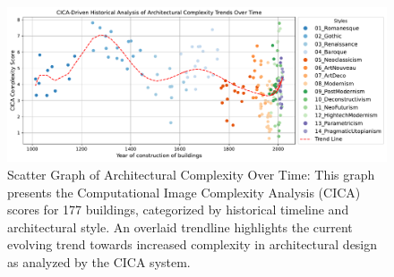 \documentclass[final,5p,times]{elsarticle}
\begin{document}
\begin{figure}[htb]
      \centering
      \includegraphics[width= \linewidth]{Graphs/complexitygraph}
      \caption{Scatter Graph of Architectural Complexity Over Time: This graph presents the Computational Image Complexity Analysis (CICA) scores for 177 buildings, categorized by historical timeline and architectural style. An overlaid trendline highlights the current evolving trend towards increased complexity in architectural design as analyzed by the CICA system.}
      \label{fig:HistoricalComplexityGraph}
\end{figure}

\stop
\end{document}
